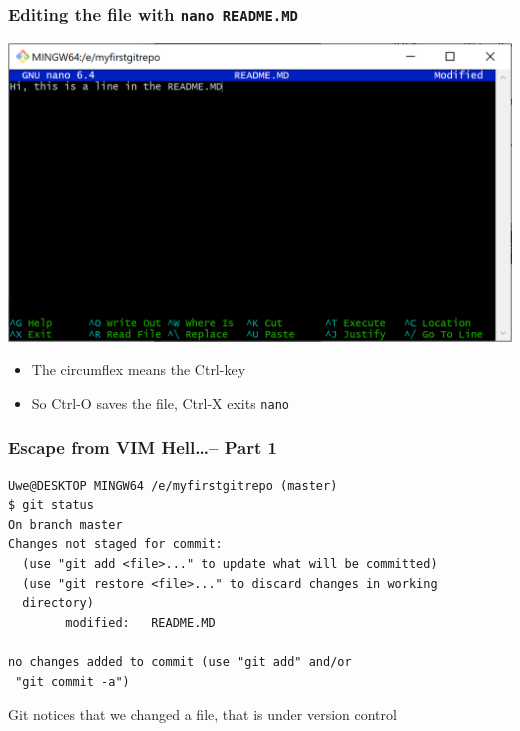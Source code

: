 \documentclass[12pt,english]{beamer}
\begin{document}
\begin{frame}
\frametitle{Editing the file with \texttt{nano README.MD}}

\includegraphics[width=\textwidth]{nano-edit}

\begin{itemize}
\item The circumflex means the Ctrl-key
\item So Ctrl-O saves the file, Ctrl-X exits \texttt{nano}
\end{itemize}

\end{frame}



\begin{frame}[containsverbatim]
\frametitle{Escape from VIM Hell\ldots -- Part 1} 

\begin{lstlisting}[basicstyle=\ttfamily\scriptsize]
Uwe@DESKTOP MINGW64 /e/myfirstgitrepo (master)
$ git status
On branch master
Changes not staged for commit:
  (use "git add <file>..." to update what will be committed)
  (use "git restore <file>..." to discard changes in working 
  directory)
        modified:   README.MD

no changes added to commit (use "git add" and/or
 "git commit -a")
\end{lstlisting}

Git notices that we changed a file, that is under version control

\end{frame}
\end{document}
